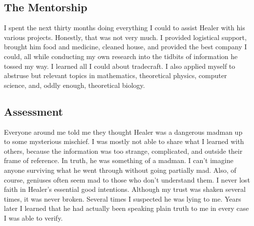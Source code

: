 \subsection*{The Mentorship}
\label{pos03:the-mentorship}

I spent the next thirty months doing everything I could to assist Healer with his various projects.  Honestly, that was not very much.  I provided logistical support, brought him food and medicine, cleaned house, and provided the best company I could, all while conducting my own research into the tidbits of information he tossed my way.  I learned all I could about tradecraft. I also applied myself to abstruse but relevant topics in mathematics, theoretical physics, computer science, and, oddly enough, theoretical biology.

\subsection*{Assessment}
\label{pos03:assessment}

Everyone around me told me they thought Healer was a dangerous madman up to some mysterious mischief.  I was mostly not able to share what I learned with others, because the information was too strange, complicated, and outside their frame of reference.  In truth, he was something of a madman.  I can't imagine anyone surviving what he went through without going partially mad.  Also, of course, geniuses often seem mad to those who don't understand them.  I never lost faith in Healer's essential good intentions.  Although my trust was shaken several times, it was never broken.  Several times I suspected he was lying to me. Years later I learned that he had actually been speaking plain truth to me in every case I was able to verify.

\chapterreturn
